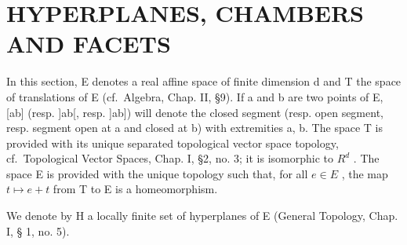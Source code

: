 \section{HYPERPLANES, CHAMBERS AND FACETS}

In this section, E denotes a real affine space of finite dimension d and T the space of translations of E (cf.~Algebra, Chap. II, §9). If a and b are two points of E, {[}ab{]} (resp. {]}ab{[}, resp. {]}ab{]}) will denote the closed segment (resp. open segment, resp. segment open at a and closed at b) with extremities a, b. The space T is provided with its unique separated topological vector space topology, cf.~Topological Vector Spaces, Chap. I, §2, no. 3; it is isomorphic to \(R^{d}\) . The space E is provided with the unique topology such that, for all \(e \in E\) , the map \(t \mapsto e + t\) from T to E is a homeomorphism.

We denote by H a locally finite set of hyperplanes of E (General Topology, Chap. I, § 1, no. 5).

